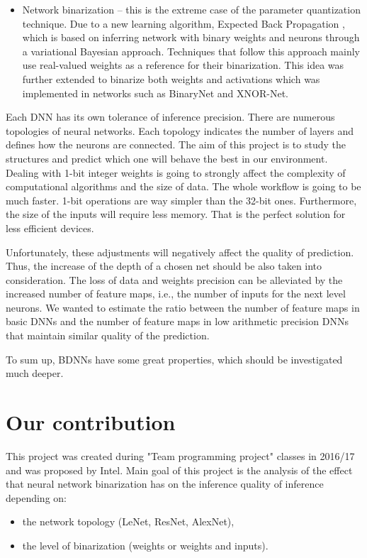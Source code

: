 \documentclass[licencjacka]{pracamgr}
\begin{document}
\begin{itemize}
		\item Network binarization -- this is the extreme case of the parameter quantization technique. Due to a new learning algorithm, Expected Back Propagation \cite{exp}, which is based on inferring network with binary weights and neurons through a variational Bayesian approach. Techniques that follow this approach mainly use real-valued weights as a reference for their binarization. This idea was further extended to binarize both weights and activations which was implemented in networks such as BinaryNet and XNOR-Net. 

	\end{itemize}

	Each DNN has its own tolerance of inference precision. There are numerous topologies of neural networks. Each topology indicates the number of layers and defines how the neurons are connected. The aim of this project is to study the structures and predict which one will behave the best in our environment. Dealing with 1-bit integer weights is going to strongly affect the complexity of computational algorithms and the size of data. The whole workflow is going to be much faster. 1-bit operations are way simpler than the 32-bit ones. Furthermore, the size of the inputs will require less memory. That is the perfect solution for less efficient devices.
	
	Unfortunately, these adjustments will negatively affect the quality of prediction. Thus, the increase of the depth of a chosen net should be also taken into consideration.  The loss of data and weights precision can be alleviated by the increased number of feature maps, i.e., the number of inputs for the next level neurons. We wanted to estimate the ratio between the number of feature maps in basic DNNs and the number of feature maps in low arithmetic precision DNNs that maintain similar quality of the prediction.
	
	 To sum up, BDNNs have some great properties, which should be investigated much deeper.

	\section{Our contribution}
	
	This project was created during "Team programming project" classes in 2016/17 and was proposed by Intel. Main goal of this project is the analysis of the effect that neural network binarization has on the inference quality of inference depending on:
	\begin{itemize}
	    \item the network topology (LeNet, ResNet, AlexNet),
	    \item the level of binarization (weights or weights and inputs).
	\end{itemize}
	
\end{document}
